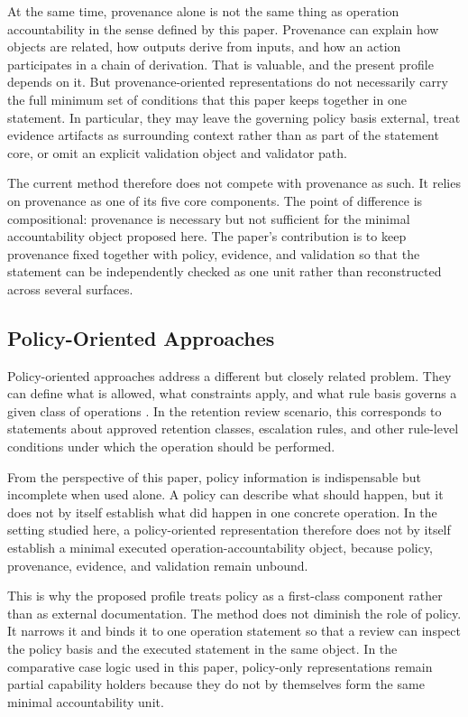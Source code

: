 At the same time, provenance alone is not the same thing as operation accountability in the sense defined by this paper. Provenance can explain how objects are related, how outputs derive from inputs, and how an action participates in a chain of derivation. That is valuable, and the present profile depends on it. But provenance-oriented representations do not necessarily carry the full minimum set of conditions that this paper keeps together in one statement. In particular, they may leave the governing policy basis external, treat evidence artifacts as surrounding context rather than as part of the statement core, or omit an explicit validation object and validator path.

The current method therefore does not compete with provenance as such. It relies on provenance as one of its five core components. The point of difference is compositional: provenance is necessary but not sufficient for the minimal accountability object proposed here. The paper's contribution is to keep provenance fixed together with policy, evidence, and validation so that the statement can be independently checked as one unit rather than reconstructed across several surfaces.

\subsection{Policy-Oriented Approaches}

Policy-oriented approaches address a different but closely related problem. They can define what is allowed, what constraints apply, and what rule basis governs a given class of operations \cite{iannella2018odrl,hu2014abac}. In the retention review scenario, this corresponds to statements about approved retention classes, escalation rules, and other rule-level conditions under which the operation should be performed.

From the perspective of this paper, policy information is indispensable but incomplete when used alone. A policy can describe what should happen, but it does not by itself establish what did happen in one concrete operation. In the setting studied here, a policy-oriented representation therefore does not by itself establish a minimal executed operation-accountability object, because policy, provenance, evidence, and validation remain unbound.

This is why the proposed profile treats policy as a first-class component rather than as external documentation. The method does not diminish the role of policy. It narrows it and binds it to one operation statement so that a review can inspect the policy basis and the executed statement in the same object. In the comparative case logic used in this paper, policy-only representations remain partial capability holders because they do not by themselves form the same minimal accountability unit.

